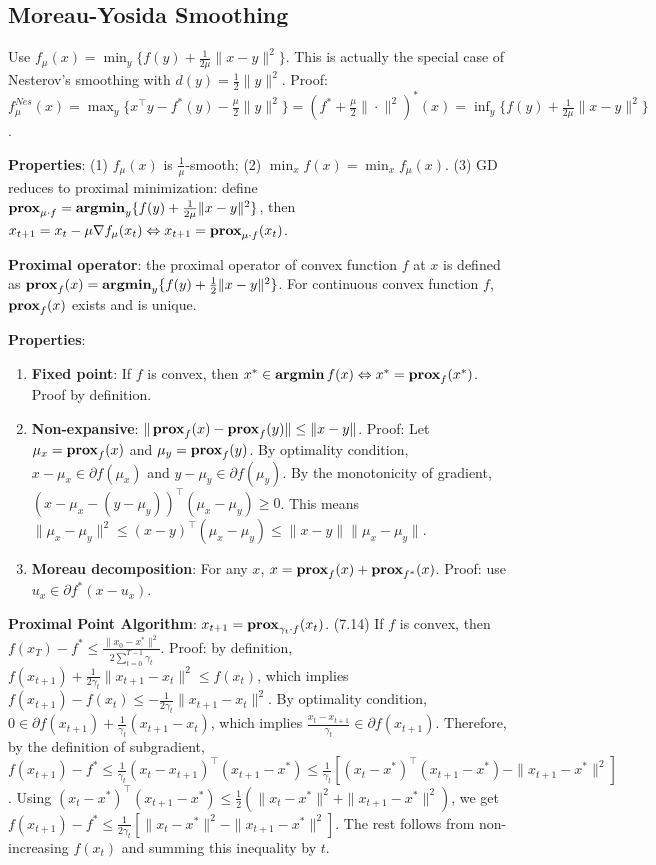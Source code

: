 \subsection{Moreau-Yosida Smoothing}

Use $f_{\mu}(x) = \min_y \{f(y) + \frac{1}{2\mu}\|x-y\|^2\}$. This is actually the special case of Nesterov's smoothing with $d(y)=\frac{1}{2}\|y\|^2$. Proof: $f_\mu^{Nes}(x) = \max_y\{x^\top y - f^*(y) - \frac{\mu}{2}\|y\|^2\}= (f^* + \frac{\mu}{2}\|\cdot\|^2)^*(x) = \inf_y \{f(y) + \frac{1}{2\mu}\|x-y\|^2\}$.

\textbf{Properties}: (1) $f_\mu(x)$ is $\frac{1}{\mu}$-smooth; (2) $\min_x f(x) = \min_x f_\mu(x)$. (3) GD reduces to proximal minimization: define $\operatorname{\textbf{prox}}_{\mu\cdot f} = \operatorname{\textbf{argmin}}_y \{f(y) + \frac{1}{2\mu}\|x-y\|^2\}$, then $x_{t+1} = x_t - \mu \nabla f_\mu(x_t) \Leftrightarrow x_{t+1} = \operatorname{\textbf{prox}}_{\mu\cdot f}(x_t)$.

\textbf{Proximal operator}: the proximal operator of convex function $f$ at $x$ is defined as $\operatorname{\textbf{prox}}_f(x) = \operatorname{\textbf{argmin}}_y\{f(y)+\frac{1}{2}\|x-y\|^2\}$. For continuous convex function $f$, $\operatorname{\textbf{prox}}_f(x)$ exists and is unique.

\textbf{Properties}:
\begin{enumerate}
    \item \textbf{Fixed point}: If $f$ is convex, then $x^* \in \operatorname{\textbf{argmin}} f(x) \Leftrightarrow x^* = \operatorname{\textbf{prox}}_f(x^*)$. Proof by definition.
    \item \textbf{Non-expansive}: $\|\operatorname{\textbf{prox}}_f(x) - \operatorname{\textbf{prox}}_f(y)\| \le \|x-y\|$. Proof: Let $\mu_x = \operatorname{\textbf{prox}}_f(x)$ and $\mu_y = \operatorname{\textbf{prox}}_f(y)$. By optimality condition, $x - \mu_x \in \partial f(\mu_x)$ and $y - \mu_y \in \partial f(\mu_y)$. By the monotonicity of gradient, $(x-\mu_x - (y-\mu_y))^\top (\mu_x - \mu_y) \ge 0$. This means $\|\mu_x - \mu_y\|^2 \le (x-y)^\top (\mu_x - \mu_y) \le \|x-y\|\|\mu_x - \mu_y\|$.
    \item \textbf{Moreau decomposition}: For any $x$, $x = \operatorname{\textbf{prox}}_f(x) + \operatorname{\textbf{prox}}_{f^*}(x)$. Proof: use $u_x \in \partial f^*(x-u_x)$.
\end{enumerate}

\textbf{Proximal Point Algorithm}: $x_{t+1} = \operatorname{\textbf{prox}}_{\gamma_t\cdot f}(x_t)$. (7.14) If $f$ is convex, then $f(x_{T}) - f^* \le \frac{\|x_0 - x^*\|^2}{2\sum_{t=0}^{T-1} \gamma_t}$. Proof: by definition, $f(x_{t+1}) + \frac{1}{2\gamma_t} \|x_{t+1} - x_t\|^2 \le f(x_t)$, which implies $f(x_{t+1}) - f(x_t) \le -\frac{1}{2\gamma_t} \|x_{t+1}-x_t\|^2$. By optimality condition, $0 \in \partial f(x_{t+1}) + \frac{1}{\gamma_t}(x_{t+1} - x_t)$, which implies $\frac{x_t - x_{t+1}}{\gamma_t} \in \partial f(x_{t+1})$. Therefore, by the definition of subgradient, $f(x_{t+1}) - f^* \le \frac{1}{\gamma_t} (x_t - x_{t+1})^\top (x_{t+1} - x^*) \le \frac{1}{\gamma_t} [(x_t - x^*)^\top (x_{t+1} - x^*) - \|x_{t+1} - x^*\|^2]$. Using $(x_t - x^*)^\top (x_{t+1} - x^*) \le \frac{1}{2}(\|x_t - x^*\|^2 + \|x_{t+1} - x^*\|^2)$, we get $ f(x_{t+1}) - f^* \le \frac{1}{2\gamma_t}[\|x_t - x^*\|^2 - \|x_{t+1} - x^*\|^2]$. The rest follows from non-increasing $f(x_t)$ and summing this inequality by $t$.

